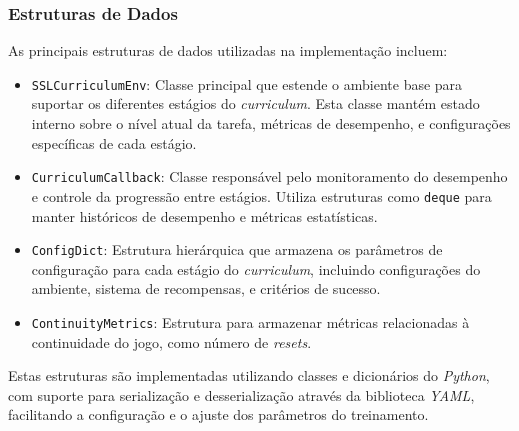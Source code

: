 \subsubsection{Estruturas de Dados}

As principais estruturas de dados utilizadas na implementação incluem:

\begin{itemize}
    \item \texttt{SSLCurriculumEnv}: Classe principal que estende o ambiente base para suportar os diferentes estágios do \textit{curriculum}. Esta classe mantém estado interno sobre o nível atual da tarefa, métricas de desempenho, e configurações específicas de cada estágio.
    
    \item \texttt{CurriculumCallback}: Classe responsável pelo monitoramento do desempenho e controle da progressão entre estágios. Utiliza estruturas como \texttt{deque} para manter históricos de desempenho e métricas estatísticas.
    
    \item \texttt{ConfigDict}: Estrutura hierárquica que armazena os parâmetros de configuração para cada estágio do \textit{curriculum}, incluindo configurações do ambiente, sistema de recompensas, e critérios de sucesso.
    
    \item \texttt{ContinuityMetrics}: Estrutura para armazenar métricas relacionadas à continuidade do jogo, como número de \textit{resets}.
\end{itemize}

Estas estruturas são implementadas utilizando classes e dicionários do \textit{Python}, com suporte para serialização e desserialização através da biblioteca \textit{YAML}, facilitando a configuração e o ajuste dos parâmetros do treinamento.



